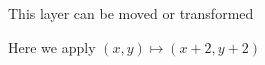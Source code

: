 \documentclass[preview]{standalone}
\begin{document}
\begin{center}
This layer can be moved or transformed

Here we apply $(x,y) \mapsto (x + 2, y + 2)$
\end{center}
\end{document}
